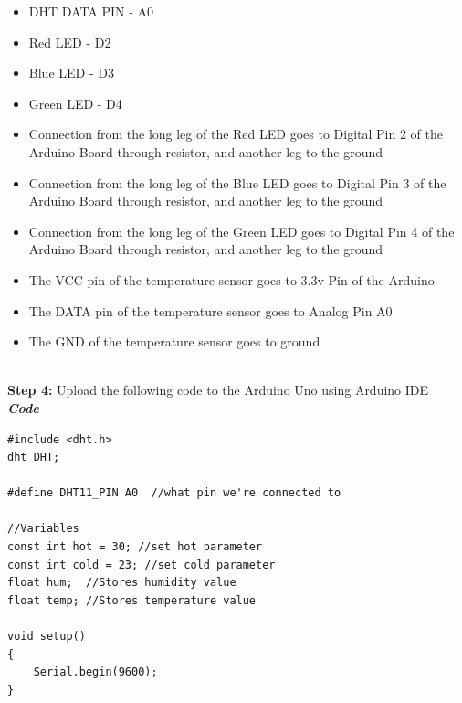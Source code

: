 \documentclass[12pt,a4paper]{article}
\begin{document}
\begin{flushleft}
\begin{itemize}[noitemsep,nolistsep]
\item DHT DATA PIN - A0
\item Red LED - D2 
\item Blue LED - D3
\item Green LED - D4

\item Connection from the long leg of the Red LED goes to Digital Pin 2 of the Arduino Board through resistor, and another leg to the ground

\item Connection from the long leg of the Blue LED goes to Digital Pin 3 of the Arduino Board through resistor, and another leg to the ground

\item Connection from the long leg of the Green LED goes to Digital Pin 4 of the Arduino Board through resistor, and another leg to the ground

\item The VCC pin of the temperature sensor goes to 3.3v Pin of the Arduino

\item The DATA pin of the temperature sensor goes to Analog Pin A0

\item The GND of the temperature sensor goes to ground
\end{itemize}
\vspace{5mm}
\\

\textbf{Step 4:} Upload the following code to the Arduino Uno using Arduino IDE \\
\vspace{5mm}
\textbf{\textit{Code}}
\begin{lstlisting}
#include <dht.h>
dht DHT;

#define DHT11_PIN A0  //what pin we're connected to

//Variables
const int hot = 30; //set hot parameter
const int cold = 23; //set cold parameter
float hum;  //Stores humidity value
float temp; //Stores temperature value

void setup()
{
    Serial.begin(9600);
}


\end{lstlisting}
\end{flushleft}
\end{document}

